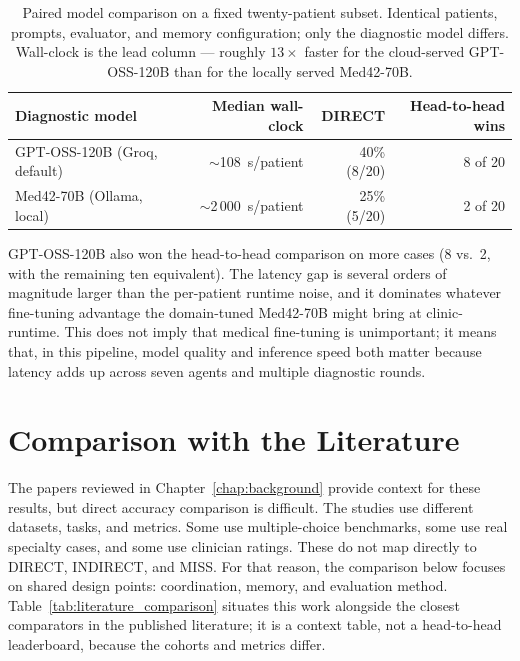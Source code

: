 \begin{table}[!htbp]
\centering
\caption{Paired model comparison on a fixed twenty-patient subset.
Identical patients, prompts, evaluator, and memory configuration;
only the diagnostic model differs. Wall-clock is the lead column ---
roughly $13\times$ faster for the cloud-served GPT-OSS-120B than for
the locally served Med42-70B.}
\label{tab:model_comparison}
\footnotesize
\begin{tabular}{@{}lrrr@{}}
\toprule
\textbf{Diagnostic model}      & \textbf{Median wall-clock} & \textbf{DIRECT} & \textbf{Head-to-head wins} \\
\midrule
GPT-OSS-120B (Groq, default)   & $\sim$108~s/patient        & 40\% (8/20)     & 8 of 20 \\
Med42-70B (Ollama, local)      & $\sim$2\,000~s/patient     & 25\% (5/20)     & 2 of 20 \\
\bottomrule
\end{tabular}
\end{table}

GPT-OSS-120B also won the head-to-head comparison on more cases
(8 vs.~2, with the remaining ten equivalent). The latency gap is
several orders of magnitude larger than the per-patient runtime
noise, and it dominates whatever fine-tuning advantage the
domain-tuned Med42-70B might bring at clinic-runtime. This does
not imply that medical fine-tuning is unimportant; it means that, in
this pipeline, model quality and inference speed both matter because
latency adds up across seven agents and multiple diagnostic rounds.

\section{Comparison with the Literature}
\label{sec:results_literature}

The papers reviewed in Chapter~\ref{chap:background} provide context for these
results, but direct accuracy comparison is difficult. The studies use different
datasets, tasks, and metrics. Some use multiple-choice benchmarks, some use
real specialty cases, and some use clinician ratings. These do not map directly
to DIRECT, INDIRECT, and MISS. For that reason, the comparison below focuses on
shared design points: coordination, memory, and evaluation method.
Table~\ref{tab:literature_comparison} situates this work alongside
the closest comparators in the published literature; it is a context
table, not a head-to-head leaderboard, because the cohorts and
metrics differ.

